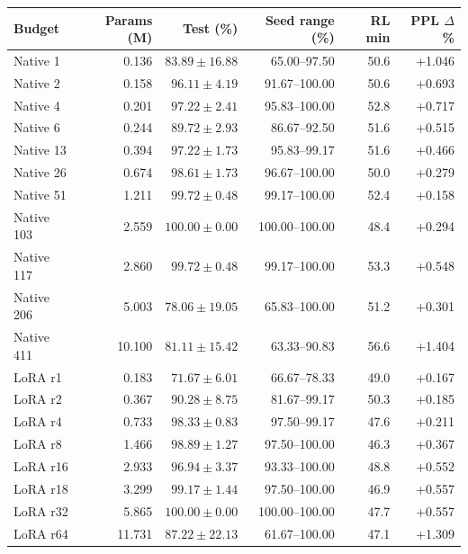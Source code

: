 \begin{tabular}{@{}lrrrrr@{}}
\toprule
Budget & Params (M) & Test (\%) & Seed range (\%) & RL min & PPL $\Delta$\%\\
\midrule
Native 1 & 0.136 & $83.89\pm16.88$ & 65.00--97.50 & 50.6 & +1.046\\
Native 2 & 0.158 & $96.11\pm4.19$ & 91.67--100.00 & 50.6 & +0.693\\
Native 4 & 0.201 & $97.22\pm2.41$ & 95.83--100.00 & 52.8 & +0.717\\
Native 6 & 0.244 & $89.72\pm2.93$ & 86.67--92.50 & 51.6 & +0.515\\
Native 13 & 0.394 & $97.22\pm1.73$ & 95.83--99.17 & 51.6 & +0.466\\
Native 26 & 0.674 & $98.61\pm1.73$ & 96.67--100.00 & 50.0 & +0.279\\
Native 51 & 1.211 & $99.72\pm0.48$ & 99.17--100.00 & 52.4 & +0.158\\
Native 103 & 2.559 & $100.00\pm0.00$ & 100.00--100.00 & 48.4 & +0.294\\
Native 117 & 2.860 & $99.72\pm0.48$ & 99.17--100.00 & 53.3 & +0.548\\
Native 206 & 5.003 & $78.06\pm19.05$ & 65.83--100.00 & 51.2 & +0.301\\
Native 411 & 10.100 & $81.11\pm15.42$ & 63.33--90.83 & 56.6 & +1.404\\
LoRA r1 & 0.183 & $71.67\pm6.01$ & 66.67--78.33 & 49.0 & +0.167\\
LoRA r2 & 0.367 & $90.28\pm8.75$ & 81.67--99.17 & 50.3 & +0.185\\
LoRA r4 & 0.733 & $98.33\pm0.83$ & 97.50--99.17 & 47.6 & +0.211\\
LoRA r8 & 1.466 & $98.89\pm1.27$ & 97.50--100.00 & 46.3 & +0.367\\
LoRA r16 & 2.933 & $96.94\pm3.37$ & 93.33--100.00 & 48.8 & +0.552\\
LoRA r18 & 3.299 & $99.17\pm1.44$ & 97.50--100.00 & 46.9 & +0.557\\
LoRA r32 & 5.865 & $100.00\pm0.00$ & 100.00--100.00 & 47.7 & +0.557\\
LoRA r64 & 11.731 & $87.22\pm22.13$ & 61.67--100.00 & 47.1 & +1.309\\
\bottomrule
\end{tabular}
